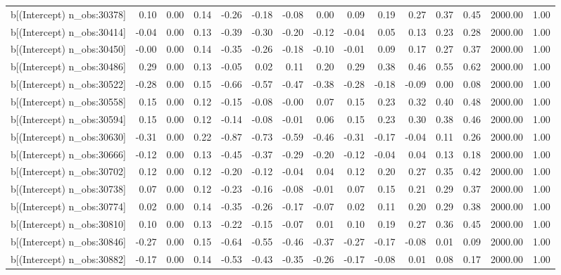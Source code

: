 \begin{table}[ht]
\begin{tabular}{rrrrrrrrrrrrrrr}
  b[(Intercept) n\_obs:30378] & 0.10 & 0.00 & 0.14 & -0.26 & -0.18 & -0.08 & 0.00 & 0.09 & 0.19 & 0.27 & 0.37 & 0.45 & 2000.00 & 1.00 \\ 
  b[(Intercept) n\_obs:30414] & -0.04 & 0.00 & 0.13 & -0.39 & -0.30 & -0.20 & -0.12 & -0.04 & 0.05 & 0.13 & 0.23 & 0.28 & 2000.00 & 1.00 \\ 
  b[(Intercept) n\_obs:30450] & -0.00 & 0.00 & 0.14 & -0.35 & -0.26 & -0.18 & -0.10 & -0.01 & 0.09 & 0.17 & 0.27 & 0.37 & 2000.00 & 1.00 \\ 
  b[(Intercept) n\_obs:30486] & 0.29 & 0.00 & 0.13 & -0.05 & 0.02 & 0.11 & 0.20 & 0.29 & 0.38 & 0.46 & 0.55 & 0.62 & 2000.00 & 1.00 \\ 
  b[(Intercept) n\_obs:30522] & -0.28 & 0.00 & 0.15 & -0.66 & -0.57 & -0.47 & -0.38 & -0.28 & -0.18 & -0.09 & 0.00 & 0.08 & 2000.00 & 1.00 \\ 
  b[(Intercept) n\_obs:30558] & 0.15 & 0.00 & 0.12 & -0.15 & -0.08 & -0.00 & 0.07 & 0.15 & 0.23 & 0.32 & 0.40 & 0.48 & 2000.00 & 1.00 \\ 
  b[(Intercept) n\_obs:30594] & 0.15 & 0.00 & 0.12 & -0.14 & -0.08 & -0.01 & 0.06 & 0.15 & 0.23 & 0.30 & 0.38 & 0.46 & 2000.00 & 1.00 \\ 
  b[(Intercept) n\_obs:30630] & -0.31 & 0.00 & 0.22 & -0.87 & -0.73 & -0.59 & -0.46 & -0.31 & -0.17 & -0.04 & 0.11 & 0.26 & 2000.00 & 1.00 \\ 
  b[(Intercept) n\_obs:30666] & -0.12 & 0.00 & 0.13 & -0.45 & -0.37 & -0.29 & -0.20 & -0.12 & -0.04 & 0.04 & 0.13 & 0.18 & 2000.00 & 1.00 \\ 
  b[(Intercept) n\_obs:30702] & 0.12 & 0.00 & 0.12 & -0.20 & -0.12 & -0.04 & 0.04 & 0.12 & 0.20 & 0.27 & 0.35 & 0.42 & 2000.00 & 1.00 \\ 
  b[(Intercept) n\_obs:30738] & 0.07 & 0.00 & 0.12 & -0.23 & -0.16 & -0.08 & -0.01 & 0.07 & 0.15 & 0.21 & 0.29 & 0.37 & 2000.00 & 1.00 \\ 
  b[(Intercept) n\_obs:30774] & 0.02 & 0.00 & 0.14 & -0.35 & -0.26 & -0.17 & -0.07 & 0.02 & 0.11 & 0.20 & 0.29 & 0.38 & 2000.00 & 1.00 \\ 
  b[(Intercept) n\_obs:30810] & 0.10 & 0.00 & 0.13 & -0.22 & -0.15 & -0.07 & 0.01 & 0.10 & 0.19 & 0.27 & 0.36 & 0.45 & 2000.00 & 1.00 \\ 
  b[(Intercept) n\_obs:30846] & -0.27 & 0.00 & 0.15 & -0.64 & -0.55 & -0.46 & -0.37 & -0.27 & -0.17 & -0.08 & 0.01 & 0.09 & 2000.00 & 1.00 \\ 
  b[(Intercept) n\_obs:30882] & -0.17 & 0.00 & 0.14 & -0.53 & -0.43 & -0.35 & -0.26 & -0.17 & -0.08 & 0.01 & 0.08 & 0.17 & 2000.00 & 1.00 \\ 

\end{tabular}
\end{table}
